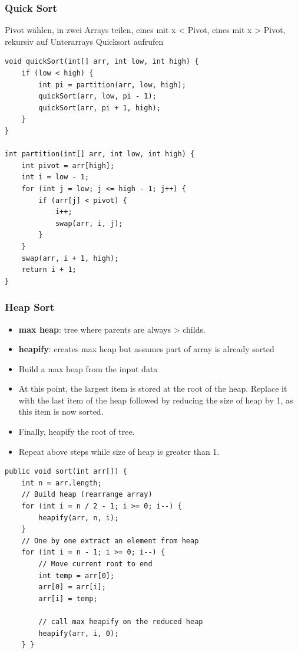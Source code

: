 \begin{multicols*}{4}
		\subsubsection{Quick Sort}
		Pivot wählen, in zwei Arrays teilen, eines mit x < Pivot, eines mit x > Pivot, rekursiv auf Unterarrays Quicksort aufrufen
			\begin{lstlisting}
void quickSort(int[] arr, int low, int high) {
	if (low < high) {
		int pi = partition(arr, low, high);
		quickSort(arr, low, pi - 1);
		quickSort(arr, pi + 1, high);
	}
}
	
int partition(int[] arr, int low, int high) {
	int pivot = arr[high];
	int i = low - 1;
	for (int j = low; j <= high - 1; j++) {
		if (arr[j] < pivot) {
			i++;
			swap(arr, i, j);
		}
	}
	swap(arr, i + 1, high);
	return i + 1;
}
			\end{lstlisting}

		\subsubsection{Heap Sort}
			\begin{itemize}
				\item \textbf{max heap}: tree where parents are always > childs.
				\item \textbf{heapify}: creates max heap but assumes part of array is already sorted
				\item Build a max heap from the input data
				\item At this point, the largest item is stored at the root of the heap. Replace it with the last item of the heap followed by reducing the size of heap by 1, as this item is now sorted.
				\item Finally, heapify the root of tree.
				\item Repeat above steps while size of heap is greater than 1.			
			\end{itemize}
		
			\vspace{2pt}
			\begin{lstlisting}
public void sort(int arr[]) { 
	int n = arr.length; 
	// Build heap (rearrange array) 
	for (int i = n / 2 - 1; i >= 0; i--) {
		heapify(arr, n, i); 
	}
	// One by one extract an element from heap 
	for (int i = n - 1; i >= 0; i--) { 
		// Move current root to end 
		int temp = arr[0]; 
		arr[0] = arr[i]; 
		arr[i] = temp; 
		
		// call max heapify on the reduced heap 
		heapify(arr, i, 0); 
	} } 


\end{lstlisting}
\end{multicols*}
